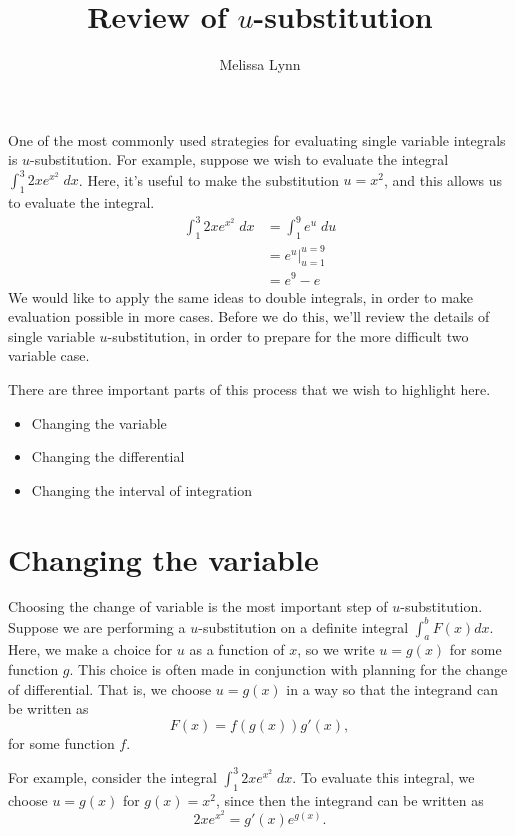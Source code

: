 \documentclass{ximera}
\title{Review of $u$-substitution}
\author{Melissa Lynn}
\begin{document}
  
\begin{abstract}  
\end{abstract}  
\maketitle  

One of the most commonly used strategies for evaluating single variable integrals is $u$-substitution. For example, suppose we wish to evaluate the integral $\int_1^3 2x e^{x^2}\;dx$. Here, it's useful to make the substitution $u=x^2$, and this allows us to evaluate the integral.
\begin{align*}
\int_1^3 2x e^{x^2}\;dx &= \int_1^9 e^u\;du\\
&= e^u |_{u=1}^{u=9}\\
&= e^9 - e
\end{align*}
We would like to apply the same ideas to double integrals, in order to make evaluation possible in more cases. Before we do this, we'll review the details of single variable $u$-substitution, in order to prepare for the more difficult two variable case.

There are three important parts of this process that we wish to highlight here.
\begin{itemize}
\item Changing the variable
\item Changing the differential
\item Changing the interval of integration
\end{itemize}


\section*{Changing the variable}

Choosing the change of variable is the most important step of $u$-substitution. Suppose we are performing a $u$-substitution on a definite integral $\int_a^b F(x)dx$. Here, we make a choice for $u$ as a function of $x$, so we write $u=g(x)$ for some function $g$. This choice is often made in conjunction with planning for the change of differential. That is, we choose $u=g(x)$ in a way so that the integrand can be written as
\[
F(x) = f(g(x))g'(x),
\]
for some function $f$.

For example, consider the integral $\int_1^3 2x e^{x^2}\;dx$. To evaluate this integral, we choose $u = g(x)$ for $g(x)=x^2$, since then the integrand can be written as
\[
2x e^{x^2} = g'(x) e^{g(x)}.
\]
\end{document}
